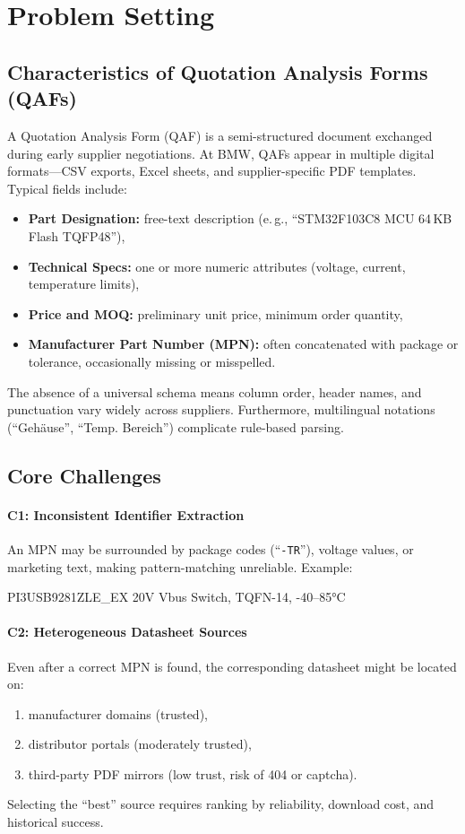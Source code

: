 \section{Problem Setting}
\label{sec:problem}

\subsection{Characteristics of Quotation Analysis Forms (QAFs)}
A Quotation Analysis Form (QAF) is a semi-structured document exchanged during early supplier negotiations.  
At BMW, QAFs appear in multiple digital formats—CSV exports, Excel sheets, and supplier-specific PDF templates.  
Typical fields include:  

\begin{itemize}
  \item \textbf{Part Designation:} free-text description (e.\,g., ``STM32F103C8 MCU 64\,KB Flash TQFP48''),
  \item \textbf{Technical Specs:} one or more numeric attributes (voltage, current, temperature limits),
  \item \textbf{Price and MOQ:} preliminary unit price, minimum order quantity,
  \item \textbf{Manufacturer Part Number (MPN):} often concatenated with package or tolerance, occasionally missing or misspelled.
\end{itemize}

The absence of a universal schema means column order, header names, and punctuation vary widely across suppliers.  
Furthermore, multilingual notations (``Gehäuse'', ``Temp. Bereich'') complicate rule-based parsing.

\subsection{Core Challenges}
\paragraph{C1: Inconsistent Identifier Extraction}  
An MPN may be surrounded by package codes (``\texttt{-TR}''), voltage values, or marketing text, making pattern-matching unreliable.  
Example:  
\begin{center}
\ttfamily PI3USB9281ZLE\_EX   20V Vbus Switch, TQFN-14, -40–85°C
\end{center}

\paragraph{C2: Heterogeneous Datasheet Sources}  
Even after a correct MPN is found, the corresponding datasheet might be located on:
\begin{enumerate}
  \item manufacturer domains (trusted),
  \item distributor portals (moderately trusted),
  \item third-party PDF mirrors (low trust, risk of 404 or captcha).
\end{enumerate}
Selecting the ``best'' source requires ranking by reliability, download cost, and historical success.

